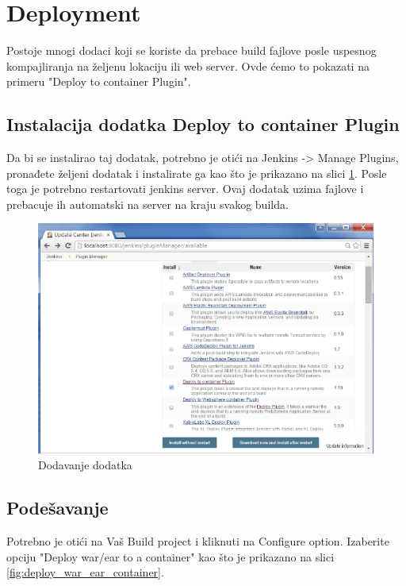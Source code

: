
\section{Deployment}

Postoje mnogi dodaci koji se koriste da prebace build fajlove posle uspesnog kompajliranja na željenu lokaciju ili web server. Ovde ćemo to pokazati na primeru "Deploy to container Plugin". 

\subsection{Instalacija dodatka Deploy to container Plugin}

Da bi se instalirao taj dodatak, potrebno je otići na Jenkins -> Manage Plugins, pronađete željeni dodatak i instalirate ga kao što je prikazano na slici \ref{fig:deploy_to_container_plugin}. Posle toga je potrebno restartovati jenkins server. Ovaj dodatak uzima fajlove i prebacuje ih automatski na server na kraju svakog builda.
\begin{figure}
\begin{center}
\includegraphics[scale=0.45]{slike/deploy_to_container_plugin.png}
\end{center}
\caption{Dodavanje dodatka}
\label{fig:deploy_to_container_plugin}
\end{figure}


\subsection{Podešavanje}

Potrebno je otići na Vaš Build project i kliknuti na Configure option. Izaberite opciju "Deploy war/ear to a container" kao što je prikazano na slici \ref{fig:deploy_war_ear_container}.

